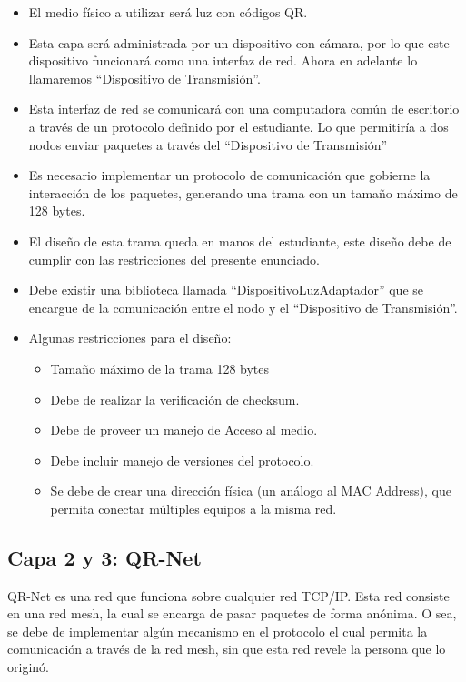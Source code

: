 \documentclass[11pt,a4paper]{scrartcl}			%
\providecommand{\tightlist}{%
          \setlength{\itemsep}{0pt}\setlength{\parskip}{0pt}}
\begin{document}
\begin{multicols*}{2}
\begin{itemize}
\tightlist
\item
  El medio físico a utilizar será luz con códigos QR.
\item
  Esta capa será administrada por un dispositivo con cámara, por lo que
  este dispositivo funcionará como una interfaz de red. Ahora en
  adelante lo llamaremos ``Dispositivo de Transmisión''.
\item
  Esta interfaz de red se comunicará con una computadora común de
  escritorio a través de un protocolo definido por el estudiante. Lo que
  permitiría a dos nodos enviar paquetes a través del ``Dispositivo de
  Transmisión''
\item
  Es necesario implementar un protocolo de comunicación que gobierne la
  interacción de los paquetes, generando una trama con un tamaño máximo
  de 128 bytes.
\item
  El diseño de esta trama queda en manos del estudiante, este diseño
  debe de cumplir con las restricciones del presente enunciado.
\item
  Debe existir una biblioteca llamada ``DispositivoLuzAdaptador'' que se
  encargue de la comunicación entre el nodo y el ``Dispositivo de
  Transmisión''.
\item
  Algunas restricciones para el diseño:

  \begin{itemize}
  \tightlist
  \item
    Tamaño máximo de la trama 128 bytes
  \item
    Debe de realizar la verificación de checksum.
  \item
    Debe de proveer un manejo de Acceso al medio.
  \item
    Debe incluir manejo de versiones del protocolo.
  \item
    Se debe de crear una dirección física (un análogo al MAC Address),
    que permita conectar múltiples equipos a la misma red.
  \end{itemize}
\end{itemize}

\subsection{Capa 2 y 3: QR-Net}\label{capa-2-y-3-qr-net}

QR-Net es una red que funciona sobre cualquier red TCP/IP. Esta red
consiste en una red mesh, la cual se encarga de pasar paquetes de forma
anónima. O sea, se debe de implementar algún mecanismo en el protocolo
el cual permita la comunicación a través de la red mesh, sin que esta
red revele la persona que lo originó.


\end{multicols*}
\end{document}
